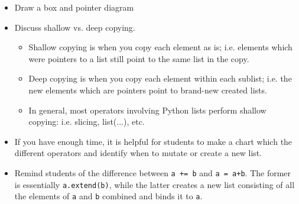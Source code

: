 \begin{blocksection}
	\begin{guide}
	\begin{itemize}
		\item Draw a box and pointer diagram
		\item Discuss shallow vs. deep copying. 
		\begin{itemize}
			\item Shallow copying is when you copy each element as is; i.e. elements which were pointers to a list still point to the same list in the copy.
			\item Deep copying is when you copy each element within each sublist; i.e. the new elements which are pointers point to brand-new created lists.
			\item In general, most operators involving Python lists perform shallow copying: i.e. slicing, list(...), etc.
		\end{itemize}
		\item If you have enough time, it is helpful for students to make a chart which the different operators and identify when to mutate or create a new list.
		\item Remind students of the difference between \lstinline{a += b} and \lstinline{a = a+b}. The former is essentially \lstinline{a.extend(b)}, while the latter creates a new list consisting of all the elements of \lstinline{a} and \lstinline{b} combined and binds it to \lstinline{a}.
	\end{itemize}
	\end{guide}
\end{blocksection}
	